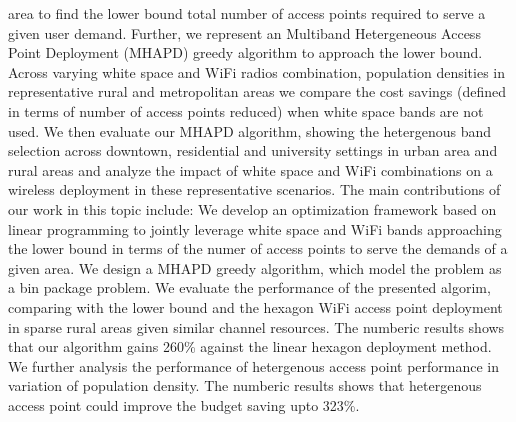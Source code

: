 area to find the lower bound total number of access points required to 
serve a given user demand. Further, we represent an Multiband Hetergeneous 
Access Point Deployment (MHAPD) greedy algorithm 
to approach the lower bound. Across varying white space and WiFi radios 
combination, population densities in representative rural and metropolitan 
areas we compare the cost savings (defined in terms of number of access 
points reduced) when white space bands are not used. We then evaluate our 
MHAPD algorithm, showing the hetergenous band selection across downtown, 
residential and university settings in urban area and rural areas and analyze 
the impact of white space and WiFi combinations on a wireless deployment in 
these representative scenarios.
The main contributions of our work in this topic include: We develop an 
optimization framework based on linear programming to jointly leverage 
white space and WiFi bands approaching the lower bound in terms of the numer 
of access points to serve the demands of a given area. We design a MHAPD 
greedy algorithm, which model the problem as a bin package problem. We 
evaluate the performance of the presented algorim, comparing with the 
lower bound and the hexagon WiFi access point deployment in sparse rural 
areas given similar channel resources. The numberic results shows that our 
algorithm gains 260\% against the linear hexagon deployment method.  We 
further analysis the performance of hetergenous access point performance in 
variation of population density. The numberic results shows that hetergenous 
access point could improve the budget saving upto 323\%. 

